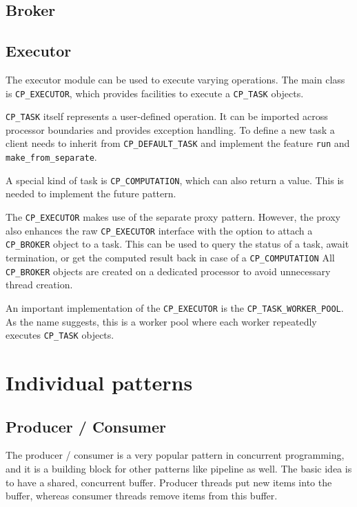 \documentclass[a4paper,10pt]{report}
\begin{document}
\subsection{Broker}



\subsection{Executor}

The executor module can be used to execute varying operations.
The main class is \lstinline!CP_EXECUTOR!, which provides facilities to execute a \lstinline!CP_TASK! objects.

\lstinline!CP_TASK! itself represents a user-defined operation.
It can be imported across processor boundaries and provides exception handling.
To define a new task a client needs to inherit from \lstinline!CP_DEFAULT_TASK! and implement the feature \lstinline!run! and \lstinline!make_from_separate!.

A special kind of task is \lstinline!CP_COMPUTATION!, which can also return a value.
This is needed to implement the future pattern.

The \lstinline!CP_EXECUTOR! makes use of the separate proxy pattern.
However, the proxy also enhances the raw \lstinline!CP_EXECUTOR! interface with the option to attach a \lstinline!CP_BROKER! object to a task.
This can be used to query the status of a task, await termination, or get the computed result back in case of a \lstinline!CP_COMPUTATION!
All \lstinline!CP_BROKER! objects are created on a dedicated processor to avoid unnecessary thread creation.

An important implementation of the \lstinline!CP_EXECUTOR! is the \lstinline!CP_TASK_WORKER_POOL!.
As the name suggests, this is a worker pool where each worker repeatedly executes \lstinline!CP_TASK! objects.

\section {Individual patterns}

\subsection{Producer / Consumer}

The producer / consumer is a very popular pattern in concurrent programming, and it is a building block for other patterns like pipeline as well.
The basic idea is to have a shared, concurrent buffer.
Producer threads put new items into the buffer, whereas consumer threads remove items from this buffer.
\end{document}
